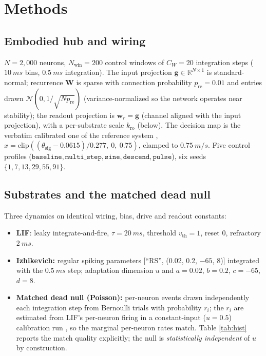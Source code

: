 \documentclass[10pt,a4paper]{article}
\begin{document}
\section{Methods}\label{sec:methods}

\subsection{Embodied hub and wiring}\label{sec:hub}

$N=2{,}000$ neurons, $N_{\mathrm{win}}=200$ control windows of
$C_W=20$ integration steps ($\SI{10}{ms}$ bins, $\SI{0.5}{ms}$
integration). The input projection
$\mathbf{g}\in\mathbb{R}^{N\times1}$ is standard-normal;
recurrence $\mathbf{W}$ is sparse with connection probability
$p_{\mathrm{re}}=0.01$ and entries drawn
$\mathcal{N}(0,1/\sqrt{N p_{\mathrm{re}}})$ (variance-normalized so the
network operates near stability); the readout projection is
$\mathbf{w}_r=\mathbf{g}$ (channel aligned with the input projection),
with a per-substrate scale $k_{\mathrm{ro}}$ (below). The decision map
is the verbatim calibrated one of the reference system
\cite{embodied_neurocomp},
$\hat{x}=\mathrm{clip}((\theta_{\mathrm{sig}}-0.0615)/0.277,\ 0,\ 0.75)$,
clamped to $\SI{0.75}{m/s}$. Five control profiles
($\mathtt{baseline},\mathtt{multi\_step},\mathtt{sine},\mathtt{descend},
\mathtt{pulse}$), six seeds $\{1,7,13,29,55,91\}$.

\subsection{Substrates and the matched dead null}\label{sec:subs}

Three dynamics on identical wiring, bias, drive and readout constants:

\begin{itemize}[nosep]
\item \textbf{LIF}: leaky integrate-and-fire, $\tau=\SI{20}{ms}$,
threshold $v_{\mathrm{th}}=1$, reset $0$, refractory $\SI{2}{ms}$.
\item \textbf{Izhikevich:} regular spiking parameters [``RS'', (0.02,
0.2, $-65$, $8$)] integrated with the $\SI{0.5}{ms}$ step; adaptation
dimension $u$ and $a=0.02$, $b=0.2$, $c=-65$, $d=8$.
\item \textbf{Matched dead null (Poisson):} per-neuron events drawn
independently each integration step from Bernoulli trials with
probability $r_i$; the $r_i$ are estimated from LIF's per-neuron
firing in a constant-input ($u=0.5$) calibration run
\cite{theiler1992}, so the marginal per-neuron rates match. Table
\ref{tab:hist} reports the match quality explicitly; the null is
\emph{statistically independent} of $u$ by construction.
\end{itemize}
\end{document}

